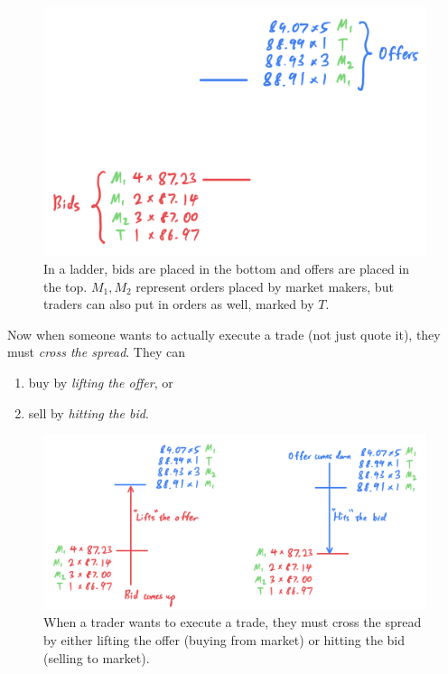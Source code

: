 \documentclass{article}
\begin{document}
    \begin{figure}[H]
      \centering 
      \includegraphics[scale=0.4]{img/futures_ladder.png}
      \caption{In a ladder, bids are placed in the bottom and offers are placed in the top. $M_1, M_2$ represent orders placed by market makers, but traders can also put in orders as well, marked by $T$.} 
      \label{fig:futures_ladder}
    \end{figure}

    Now when someone wants to actually execute a trade (not just quote it), they must \textit{cross the spread}. They can 
    \begin{enumerate}
      \item buy by \textit{lifting the offer}, or 
      \item sell by \textit{hitting the bid}. 
    \end{enumerate}

    \begin{figure}[H]
      \centering 
      \includegraphics[scale=0.4]{img/crossing_the_spread.png}
      \caption{When a trader wants to execute a trade, they must cross the spread by either lifting the offer (buying from market) or hitting the bid (selling to market). } 
      \label{fig:crossing_the_spread}
    \end{figure}
\end{document}
